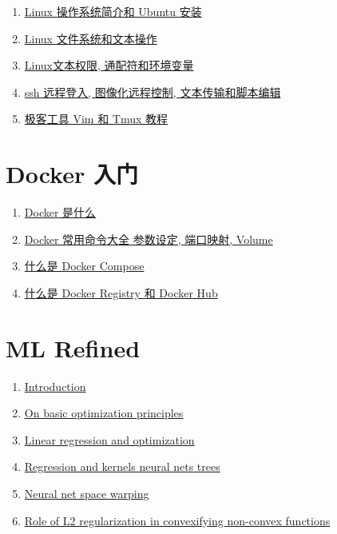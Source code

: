 \documentclass[11pt]{article}
\begin{document}
\begin{enumerate}
	\item \href{https://mp.weixin.qq.com/s/1Dq6-LhbW_YEejS1rG0ePw}{Linux 操作系统简介和 Ubuntu 安装} %
	\item \href{https://mp.weixin.qq.com/s/ENf2ox0N5Bsyoh7fDlSlPA}{Linux 文件系统和文本操作} %
	\item \href{https://mp.weixin.qq.com/s/PBy36Av8DL3SGEo81dJ_Uw}{Linux文本权限, 通配符和环境变量} %
	\item \href{https://mp.weixin.qq.com/s/2lY2HWh1lF693va-MPHrZg}{ssh 远程登入, 图像化远程控制, 文本传输和脚本编辑} %
	\item \href{https://mp.weixin.qq.com/s/qttNYbjj4tFwWEaXMflxsA}{极客工具 Vim 和 Tmux 教程} %
\end{enumerate}

\vspace{0.5cm}

\section{\kaishu Docker 入门}

\begin{enumerate}
	\item \href{https://mp.weixin.qq.com/s/CdeE-5IU9-g0G-Kx0Uyp_A}{Docker 是什么} %
	\item \href{https://mp.weixin.qq.com/s/ocnwfIgedtaWsPdL3NHgIQ}{Docker 常用命令大全 参数设定, 端口映射, Volume} %
	\item \href{https://mp.weixin.qq.com/s/WlbSmc7oipgcO-Vx6FXaVQ}{什么是 Docker Compose} %
	\item \href{https://mp.weixin.qq.com/s/z7EFzjrAeBCPCpaRlFYJwA}{什么是 Docker Registry 和 Docker Hub} %
\end{enumerate}


\vspace{0.5cm}

\section{\kaishu ML Refined}

\begin{enumerate}
	\item \href{https://mp.weixin.qq.com/s/Isj8-B6tI9sqQduIRHR7cQ}{Introduction} %
	\item \href{https://mp.weixin.qq.com/s/uwzARzG_h_5IMeV5YpmqLQ}{On basic optimization principles} %
	\item \href{https://mp.weixin.qq.com/s/tfF5gmB7yLcKF-tUZdVssw}{Linear regression and optimization} %
	\item \href{https://mp.weixin.qq.com/s/mg0Rs6zP3P3AWXW4eJH3-w}{Regression and kernels neural nets  trees} %
	\item \href{https://mp.weixin.qq.com/s/aXkLqU6VAH37Tju8ODhlqA}{Neural net space warping} %
	\item \href{https://mp.weixin.qq.com/s/ZQHjDnyXHxaH33Nmk58LuA}{Role of L2 regularization in convexifying non-convex functions} %
\end{enumerate}
\end{document}
